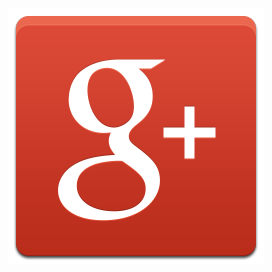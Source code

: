 \href{https://plus.google.com/u/0/+pjdelossantos}{\includegraphics[scale=0.1]{src/ch0/google_logo.png}}
